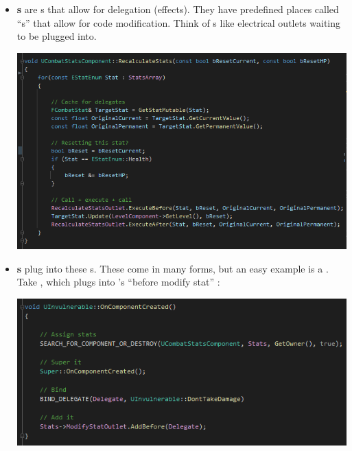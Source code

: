 \begin{itemize}
	\item{\textbf{s} are s that allow for delegation (effects). They have predefined places called ``s'' that allow for code modification. Think of s like electrical outlets waiting to be plugged into.
		\begin{center}
			\includegraphics[scale=\ScreenshotScale]{recalculate-stats-code}
		\end{center}
		}
	\item{\textbf{s} plug into these s. These come in many forms, but an easy example is a . Take , which plugs into 's ``before modify stat'' :
		\begin{center}
			\includegraphics[scale=\ScreenshotScale]{invulnerable}
		\end{center}
	}
\end{itemize}

